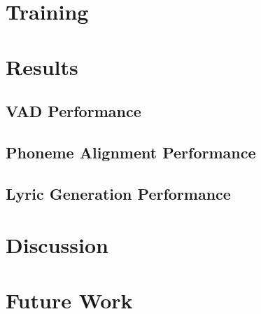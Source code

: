 \documentclass[letterpaper, 12pt]{article}
\begin{document}
\begin{multicols*}{2}

\section{Training}



\section{Results}

\subsection{VAD Performance}

\subsection{Phoneme Alignment Performance}

\subsection{Lyric Generation Performance}

\section{Discussion}

\section{Future Work}

\end{multicols*}
\end{document}
